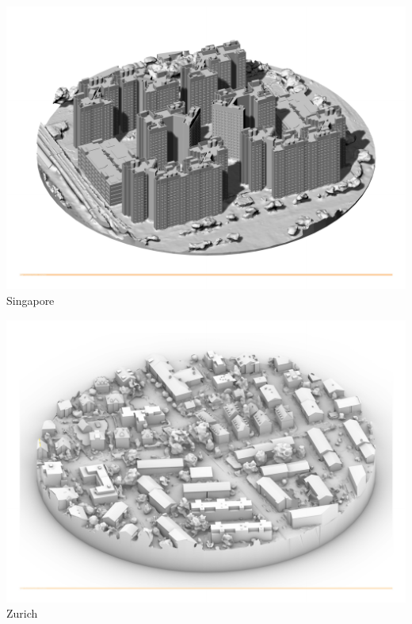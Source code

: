 \documentclass[a4paper,9pt]{article}
\begin{document}
\begin{minipage}{0.48\linewidth}
        \centering
        \includegraphics[width=\linewidth]{Images/modelsg.pdf}
       \\{Singapore}
         \label{model sg}
    \end{minipage}
    \hfill
    \begin{minipage}{0.48\linewidth}
         \centering
        \includegraphics[width=.85\linewidth]{Images/modelzh.pdf}
       \\{Zurich}
        \label{model zh}
    \end{minipage}
\end{document}
